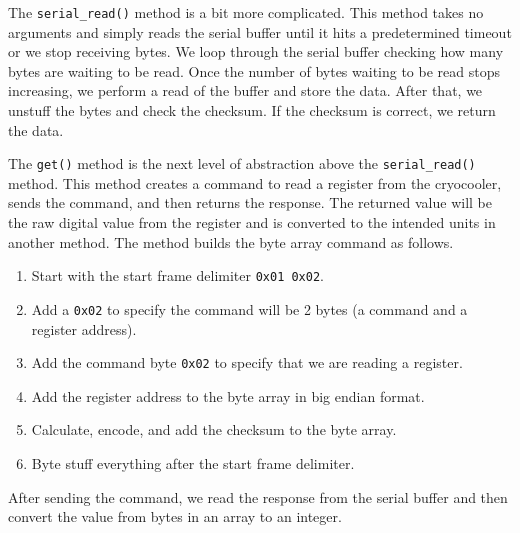 The \texttt{serial\_read()} method is a bit more complicated.
This method takes no arguments and simply reads the serial buffer until it hits a predetermined timeout or we stop receiving bytes.
We loop through the serial buffer checking how many bytes are waiting to be read.
Once the number of bytes waiting to be read stops increasing, we perform a read of the buffer and store the data.
After that, we unstuff the bytes and check the checksum. 
If the checksum is correct, we return the data.  

The \texttt{get()} method is the next level of abstraction above the \texttt{serial\_read()} method.
This method creates a command to read a register from the cryocooler, sends the command, and then returns the response. 
The returned value will be the raw digital value from the register and is converted to the intended units in another method.
The method builds the byte array command as follows.
\begin{enumerate}
    \item Start with the start frame delimiter \texttt{0x01 0x02}.
    \item Add a \texttt{0x02} to specify the command will be 2 bytes (a command and a register address).
    \item Add the command byte \texttt{0x02} to specify that we are reading a register.
    \item Add the register address to the byte array in big endian format.
    \item Calculate, encode, and add the checksum to the byte array.
    \item Byte stuff everything after the start frame delimiter.
\end{enumerate}
After sending the command, we read the response from the serial buffer and then convert the value from bytes in an array to an integer. 

